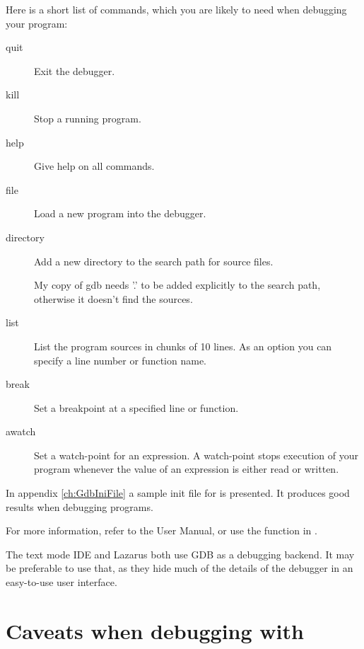 Here is a short list of  commands, which you are likely to need when
debugging your program:
\begin{description}
\item [quit\ ] Exit the debugger.
\item [kill\ ] Stop a running program.
\item [help\ ] Give help on all  commands.
\item [file\ ] Load a new program into the debugger.
\item [directory\ ] Add a new directory to the search path for source
files.\\
\begin{remark}
My copy of gdb needs '.' to be added explicitly to the search
path, otherwise it doesn't find the sources.
\end{remark}
\item [list\ ] List the program sources in chunks of 10 lines. As an option you can
specify a line number or function name.
\item [break\ ] Set a breakpoint at a specified line or function.
\item [awatch\ ] Set a watch-point for an expression. A watch-point stops
execution of your program whenever the value of an expression is either
read or written.
\end{description}

In appendix {\ref{ch:GdbIniFile}} a sample init file for
 is presented. It produces good results when debugging \fpc programs.

For more information, refer to the  User Manual, or use the
 function in .

The text mode IDE and Lazarus both use GDB as a debugging backend. It may
be preferable to use that, as they hide much of the details of the debugger
in an easy-to-use user interface.

\section{Caveats when debugging with }

